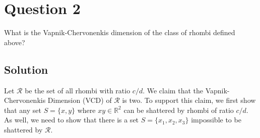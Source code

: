 
\section*{Question 2}

What is the Vapnik-Chervonenkis dimension of the class of rhombi defined above?

\subsection*{Solution}

Let $\mathcal{R}$ be the set of all rhombi with ratio $c/d$.
We claim that the Vapnik-Chervonenkis Dimension  (VCD) of $\mathcal{R}$ is two.
To support this claim, we first show that any set $ S = \{x, y\}$ where $x y \in \mathbb{R}^2$ can be shattered by rhombi of ratio $c/d$.
As well, we need to show that there is a set $S = \{x_1, x_2, x_3\}$ impossible to be shattered by $\mathcal{R}$.


